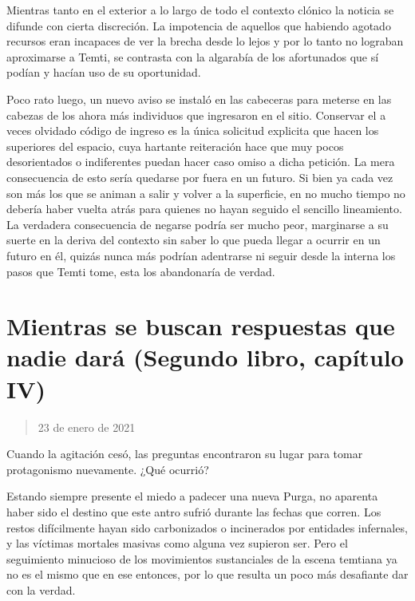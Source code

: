 \documentclass[
]{book}
\begin{document}
Mientras tanto en el exterior a lo largo de todo el contexto clónico la noticia se difunde con cierta discreción. La impotencia de aquellos que habiendo agotado recursos eran incapaces de ver la brecha desde lo lejos y por lo tanto no lograban aproximarse a Temti, se contrasta con la algarabía de los afortunados que sí podían y hacían uso de su oportunidad.

Poco rato luego, un nuevo aviso se instaló en las cabeceras para meterse en las cabezas de los ahora más individuos que ingresaron en el sitio. Conservar el a veces olvidado código de ingreso es la única solicitud explicita que hacen los superiores del espacio, cuya hartante reiteración hace que muy pocos desorientados o indiferentes puedan hacer caso omiso a dicha petición. La mera consecuencia de esto sería quedarse por fuera en un futuro. Si bien ya cada vez son más los que se animan a salir y volver a la superficie, en no mucho tiempo no debería haber vuelta atrás para quienes no hayan seguido el sencillo lineamiento. La verdadera consecuencia de negarse podría ser mucho peor, marginarse a su suerte en la deriva del contexto sin saber lo que pueda llegar a ocurrir en un futuro en él, quizás nunca más podrían adentrarse ni seguir desde la interna los pasos que Temti tome, esta los abandonaría de verdad.

\hypertarget{mientras-se-buscan-respuestas-que-nadie-daruxe1-segundo-libro-capuxedtulo-iv}{%
\section{Mientras se buscan respuestas que nadie dará (Segundo libro, capítulo IV)}\label{mientras-se-buscan-respuestas-que-nadie-daruxe1-segundo-libro-capuxedtulo-iv}}

\begin{quote}
23 de enero de 2021
\end{quote}

Cuando la agitación cesó, las preguntas encontraron su lugar para tomar protagonismo nuevamente. ¿Qué ocurrió?

Estando siempre presente el miedo a padecer una nueva Purga, no aparenta haber sido el destino que este antro sufrió durante las fechas que corren. Los restos difícilmente hayan sido carbonizados o incinerados por entidades infernales, y las víctimas mortales masivas como alguna vez supieron ser. Pero el seguimiento minucioso de los movimientos sustanciales de la escena temtiana ya no es el mismo que en ese entonces, por lo que resulta un poco más desafiante dar con la verdad.
\end{document}
